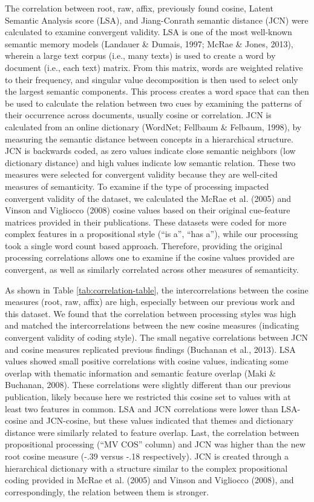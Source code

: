 \documentclass[english,,man]{apa6}
\begin{document}
The correlation between root, raw, affix, previously found cosine, Latent Semantic Analysis score (LSA), and Jiang-Conrath semantic distance (JCN) were calculated to examine convergent validity. LSA is one of the most well-known semantic memory models (Landauer \& Dumais, 1997; McRae \& Jones, 2013), wherein a large text corpus (i.e., many texts) is used to create a word by document (i.e., each text) matrix. From this matrix, words are weighted relative to their frequency, and singular value decomposition is then used to select only the largest semantic components. This process creates a word space that can then be used to calculate the relation between two cues by examining the patterns of their occurrence across documents, usually cosine or correlation. JCN is calculated from an online dictionary (WordNet; Fellbaum \& Felbaum, 1998), by measuring the semantic distance between concepts in a hierarchical structure. JCN is backwards coded, as zero values indicate close semantic neighbors (low dictionary distance) and high values indicate low semantic relation. These two measures were selected for convergent validity because they are well-cited measures of semanticity. To examine if the type of processing impacted convergent validity of the dataset, we calculated the McRae et al. (2005) and Vinson and Vigliocco (2008) cosine values based on their original cue-feature matrices provided in their publications. These datasets were coded for more complex features in a propositional style (\enquote{is a}, \enquote{has a}), while our processing took a single word count based approach. Therefore, providing the original processing correlations allows one to examine if the cosine values provided are convergent, as well as similarly correlated across other measures of semanticity.

As shown in Table \ref{tab:correlation-table}, the intercorrelations between the cosine measures (root, raw, affix) are high, especially between our previous work and this dataset. We found that the correlation between processing styles was high and matched the intercorrelations between the new cosine measures (indicating convergent validity of coding style). The small negative correlations between JCN and cosine measures replicated previous findings (Buchanan et al., 2013). LSA values showed small positive correlations with cosine values, indicating some overlap with thematic information and semantic feature overlap (Maki \& Buchanan, 2008). These correlations were slightly different than our previous publication, likely because here we restricted this cosine set to values with at least two features in common. LSA and JCN correlations were lower than LSA-cosine and JCN-cosine, but these values indicated that themes and dictionary distance were similarly related to feature overlap. Last, the correlation between propositional processing (\enquote{MV COS} column) and JCN was higher than the new root cosine measure (-.39 versus -.18 respectively). JCN is created through a hierarchical dictionary with a structure similar to the complex propositional coding provided in McRae et al. (2005) and Vinson and Vigliocco (2008), and correspondingly, the relation between them is stronger.
\end{document}
